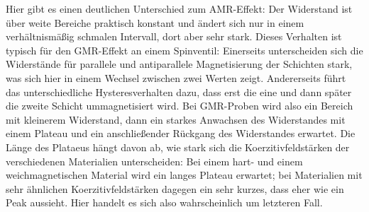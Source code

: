 \documentclass[german,  %
parskip=full,  %
]{scrartcl}
\begin{document}
Hier gibt es einen deutlichen Unterschied zum AMR-Effekt: Der Widerstand ist über weite Bereiche praktisch konstant und ändert sich nur in einem verhältnismäßig schmalen Intervall, dort aber sehr stark. Dieses Verhalten ist typisch für den GMR-Effekt an einem Spinventil: Einerseits unterscheiden sich die Widerstände für parallele und antiparallele Magnetisierung der Schichten stark, was sich hier in einem  Wechsel zwischen zwei Werten zeigt. Andererseits führt das unterschiedliche Hysteresverhalten dazu, dass erst die eine und dann später die zweite Schicht ummagnetisiert wird. Bei GMR-Proben wird also ein Bereich mit kleinerem Widerstand, dann ein starkes Anwachsen des Widerstandes mit einem Plateau und ein anschließender Rückgang des Widerstandes erwartet. Die Länge des Plataeus hängt davon ab, wie stark sich die Koerzitivfeldstärken der verschiedenen Materialien unterscheiden: Bei einem hart- und einem weichmagnetischen Material wird ein langes Plateau erwartet; bei Materialien mit sehr ähnlichen Koerzitivfeldstärken dagegen ein sehr kurzes, dass eher wie ein Peak aussieht. Hier handelt es sich also wahrscheinlich um letzteren Fall.
\end{document}
